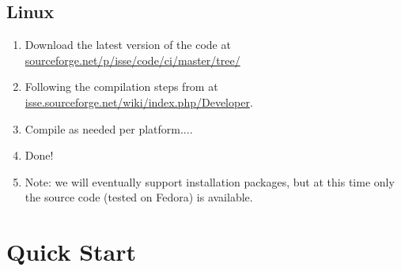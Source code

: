 \documentclass[11pt]{article}
\begin{document}
\subsection{Linux}
\begin{enumerate}
\item Download the latest version of the code at  \textcolor{blue}{\href{http://sourceforge.net/p/isse/code/ci/master/tree/}{sourceforge.net/p/isse/code/ci/master/tree/}}
\item Following the compilation steps from at \textcolor{blue}{\href{http://isse.sourceforge.net/wiki/index.php/Developer}{isse.sourceforge.net/wiki/index.php/Developer}}.
\item Compile as needed per platform....
\item Done! 
\item Note: we will eventually support installation packages, but at this time only the source code (tested on Fedora) is available.
\end{enumerate}

\section{Quick Start}
\end{document}
